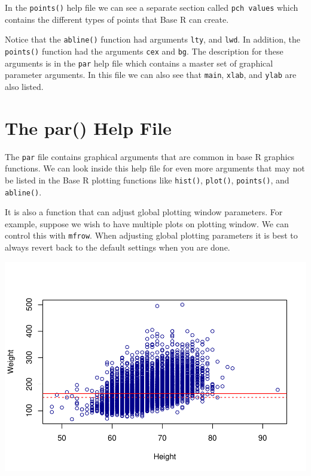 \documentclass[
]{book}
\newenvironment{Shaded}{\begin{snugshade}}{\end{snugshade}}
\newcommand{\CommentTok}[1]{\textcolor[rgb]{0.56,0.35,0.01}{\textit{#1}}}
\newcommand{\DataTypeTok}[1]{\textcolor[rgb]{0.13,0.29,0.53}{#1}}
\newcommand{\DecValTok}[1]{\textcolor[rgb]{0.00,0.00,0.81}{#1}}
\newcommand{\KeywordTok}[1]{\textcolor[rgb]{0.13,0.29,0.53}{\textbf{#1}}}
\newcommand{\NormalTok}[1]{#1}
\newcommand{\OperatorTok}[1]{\textcolor[rgb]{0.81,0.36,0.00}{\textbf{#1}}}
\begin{document}
In the \texttt{points()} help file we can see a separate section called \texttt{pch\ values} which contains the different types of points that Base R can create.

Notice that the \texttt{abline()} function had arguments \texttt{lty}, and \texttt{lwd}. In addition, the \texttt{points()} function had the arguments \texttt{cex} and \texttt{bg}. The description for these arguments is in the \texttt{par} help file which contains a master set of graphical parameter arguments. In this file we can also see that \texttt{main}, \texttt{xlab}, and \texttt{ylab} are also listed.

\hypertarget{the-par-help-file}{%
\section{The par() Help File}\label{the-par-help-file}}

The \texttt{par} file contains graphical arguments that are common in base R graphics functions. We can look inside this help file for even more arguments that may not be listed in the Base R plotting functions like \texttt{hist()}, \texttt{plot()}, \texttt{points()}, and \texttt{abline()}.

It is also a function that can adjust global plotting window parameters. For example, suppose we wish to have multiple plots on plotting window. We can control this with \texttt{mfrow}. When adjusting global plotting parameters it is best to always revert back to the default settings when you are done.

\begin{Shaded}
\end{Shaded}

\includegraphics{_main_files/figure-latex/unnamed-chunk-187-1.pdf}
\end{document}
